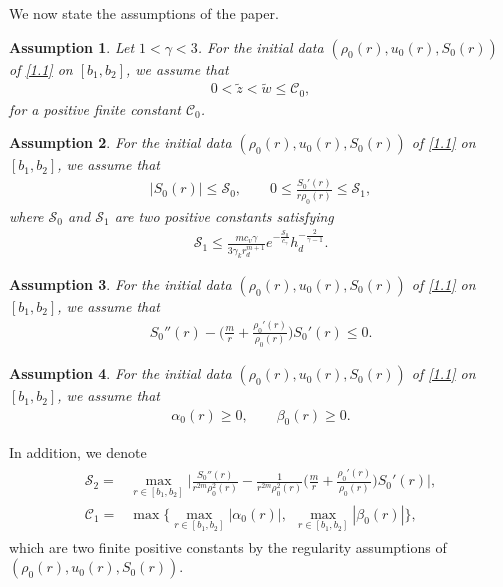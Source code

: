 \documentclass[11pt,reqno]{article}
\newtheorem{asu}{Assumption}
\newcommand{\fr}{\frac}
\numberwithin{equation}{section}
\begin{document}
We now state the assumptions of the paper.
\begin{asu}\label{asu1}
Let $1<\gamma<3$. For the initial data $(\rho_0(r), u_0(r), S_0(r) )$ of \eqref{1.1} on $[b_1, b_2]$, we assume that
\begin{align}\label{2.19}
0<\tilde{z}<\tilde{w}\leq \mathcal{C}_0,
\end{align}
for a positive finite constant $\mathcal{C}_0$.
\end{asu}

\begin{asu}\label{asu2}
For the initial data $(\rho_0(r), u_0(r), S_0(r) )$ of \eqref{1.1} on $[b_1, b_2]$, we assume that
\begin{align}\label{2.20}
|S_0(r)|\leq \mathcal{S}_0,\qquad 0\leq \fr{S_{0}'(r)}{r\rho_0(r)}\leq \mathcal{S}_1,
\end{align}
where $\mathcal{S}_0$ and $\mathcal{S}_1$ are two positive constants satisfying
\begin{align}\label{2.21}
\mathcal{S}_1\leq \fr{mc_v\gamma}{3\gamma_k r_{d}^{m+1}}e^{-\fr{\mathcal{S}_0}{c_\gamma}}h_{d}^{-\fr{2}{\gamma-1}}.
\end{align}
\end{asu}

\begin{asu}\label{asu3}
For the initial data $(\rho_0(r), u_0(r), S_0(r) )$ of \eqref{1.1} on $[b_1, b_2]$, we assume that
\begin{align}\label{2.22}
S_{0}''(r)-\Big(\fr{m}{r}+\fr{\rho_{0}'(r)}{\rho_0(r)}\Big)S_{0}'(r)\leq0.
\end{align}
\end{asu}


\begin{asu}\label{asu4}
For the initial data $(\rho_0(r), u_0(r), S_0(r) )$ of \eqref{1.1} on $[b_1, b_2]$, we assume that
\begin{align}\label{2.23}
\alpha_0(r)\geq0,\qquad \beta_0(r)\geq0.
\end{align}
\end{asu}

In addition, we denote
\begin{align}\label{2.24}
\begin{split}
\mathcal{S}_2=&\max_{r\in[b_1,b_2]} \bigg|\fr{S_{0}''(r)}{r^{2m}\rho_{0}^2(r)} -\fr{1}{r^{2m}\rho_{0}^2(r)}\Big(\fr{m}{r}+\fr{\rho_{0}'(r)}{\rho_0(r)}\Big)S_{0}'(r)\bigg|, \\
\mathcal{C}_1=&\max\bigg\{\max_{r\in[b_1,b_2]}|\alpha_0(r)|,\ \  \max_{r\in[b_1,b_2]}|\beta_0(r)|\bigg\},
\end{split}
\end{align}
which are two finite positive constants by the regularity assumptions of $(\rho_0(r), u_0(r), S_0(r))$.
\end{document}
